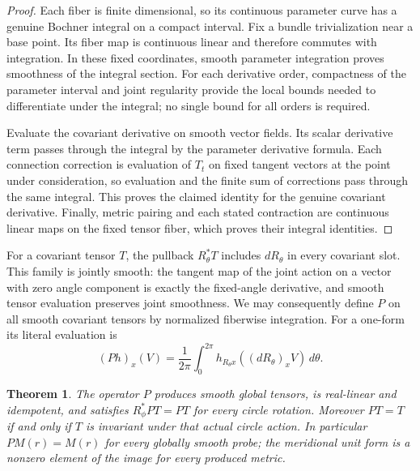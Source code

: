 \documentclass[11pt]{article}
\newtheorem{theorem}{Theorem}[section]
\begin{document}
\begin{proof}
Each fiber is finite dimensional, so its continuous parameter curve
has a genuine Bochner integral on a compact interval. Fix a bundle
trivialization near a base point. Its fiber map is continuous linear
and therefore commutes with integration. In these fixed coordinates,
smooth parameter integration proves smoothness of the integral section.
For each derivative order, compactness of the parameter interval and
joint regularity provide the local bounds needed to differentiate under
the integral; no single bound for all orders is required.

Evaluate the covariant derivative on smooth vector fields. Its scalar
derivative term passes through the integral by the parameter derivative
formula. Each connection correction is evaluation of $T_t$ on fixed
tangent vectors at the point under consideration, so evaluation and the
finite sum of corrections pass through the same integral. This proves
the claimed identity for the genuine covariant derivative. Finally,
metric pairing and each stated contraction are continuous linear maps
on the fixed tensor fiber, which proves their integral identities.
\end{proof}

For a covariant tensor $T$, the pullback $R_\theta^*T$ includes
$dR_\theta$ in every covariant slot. This family is jointly smooth:
the tangent map of the joint action on a vector with zero angle component
is exactly the fixed-angle derivative, and smooth tensor evaluation
preserves joint smoothness. We may consequently define $P$ on all smooth
covariant tensors by normalized fiberwise integration. For a one-form its
literal evaluation is
\begin{equation}\label{eq:haar-covector-average}
 (Ph)_x(V)=\frac1{2\pi}\int_0^{2\pi}
 h_{R_\theta x}((dR_\theta)_xV)\,d\theta.
\end{equation}

\begin{theorem}\label{thm:haar-projection}
The operator $P$ produces smooth global tensors, is real-linear and
idempotent, and satisfies $R_\phi^*PT=PT$ for every circle rotation.
Moreover $PT=T$ if and only if $T$ is invariant under that actual circle
action. In particular $PM(r)=M(r)$ for every globally smooth probe;
the meridional unit form is a nonzero element of the image for every
produced metric.
\end{theorem}
\end{document}
